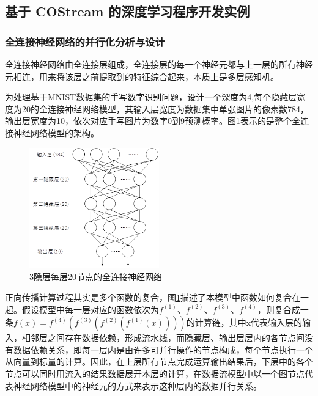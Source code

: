 \subsection{基于 COStream 的深度学习程序开发实例}
\subsubsection{全连接神经网络的并行化分析与设计}
全连接神经网络由全连接层组成，全连接层的每一个神经元都与上一层的所有神经元相连，用来将该层之前提取到的特征综合起来，本质上是多层感知机。

为处理基于MNIST数据集的手写数字识别问题，设计一个深度为4,每个隐藏层宽度为20的全连接神经网络模型，其输入层宽度为数据集中单张图片的像素数784，输出层宽度为10，依次对应手写图片为数字0到9预测概率。图\ref{fig:dnn}表示的是整个全连接神经网络模型的架构。

\begin{figure}[!t]
\centering
\includegraphics[width=0.5\textwidth]{../img/Chap_Application/Yu/dnn.png}
\caption{3隐层每层20节点的全连接神经网络}
\label{fig:dnn}
\end{figure}

正向传播计算过程其实是多个函数的复合，图\ref{fig:dnn}描述了本模型中函数如何复合在一起。假设模型中每一层对应的函数依次为$f^{\left (1 \right )}$、$f^{\left (2 \right )}$、$f^{\left (3 \right )}$、$f^{\left (4 \right )}$，则复合成一条$f\left ( x \right )= f^{\left (4 \right )}\left ( f^{\left (3 \right )}\left ( f^{\left (2 \right )}\left ( f^{\left (1 \right )}\left ( x \right ) \right ) \right ) \right )$的计算链，其中x代表输入层的输入，相邻层之间存在数据依赖，形成流水线，而隐藏层、输出层层内的各节点间没有数据依赖关系，即每一层内是由许多可并行操作的节点构成，每个节点执行一个从向量到标量的计算。因此，在上层所有节点完成运算输出结果后，下层中的各个节点可以同时用流入的结果数据展开本层的计算，在数据流模型中以一个图节点代表神经网络模型中的神经元的方式来表示这种层内的数据并行关系。

